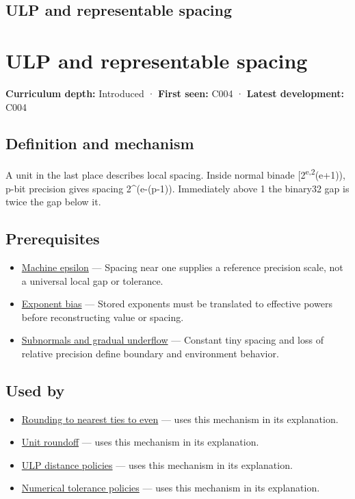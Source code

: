 \hypertarget{appendix-14bab4cab9d4}{}
\section*{ULP and representable spacing}
\chapter{ULP and representable spacing}\label{appendix-14bab4cab9d4-ulp-and-representable-spacing}

\textbf{Curriculum depth:} Introduced · \textbf{First seen:} C004 · \textbf{Latest development:} C004

\section{Definition and mechanism}\label{appendix-14bab4cab9d4-definition-and-mechanism}

A unit in the last place describes local spacing. Inside normal binade {[}2\textsuperscript{e,2}(e+1)), p-bit precision gives spacing 2\^{}(e-(p-1)). Immediately above 1 the binary32 gap is twice the gap below it.

\section{Prerequisites}\label{appendix-14bab4cab9d4-prerequisites}

\begin{itemize}
\tightlist
\item
  \hyperref[appendix-390ea641da54]{Machine epsilon} --- Spacing near one supplies a reference precision scale, not a universal local gap or tolerance.
\item
  \hyperref[appendix-2fae058c82e1]{Exponent bias} --- Stored exponents must be translated to effective powers before reconstructing value or spacing.
\item
  \hyperref[appendix-00a6e044c437]{Subnormals and gradual underflow} --- Constant tiny spacing and loss of relative precision define boundary and environment behavior.
\end{itemize}

\section{Used by}\label{appendix-14bab4cab9d4-used-by}

\begin{itemize}
\tightlist
\item
  \hyperref[appendix-614afe1de592]{Rounding to nearest ties to even} --- uses this mechanism in its explanation.
\item
  \hyperref[appendix-bc44f7b42f42]{Unit roundoff} --- uses this mechanism in its explanation.
\item
  \hyperref[appendix-deca299ae4b8]{ULP distance policies} --- uses this mechanism in its explanation.
\item
  \hyperref[appendix-0ec599f8ba27]{Numerical tolerance policies} --- uses this mechanism in its explanation.
\end{itemize}

